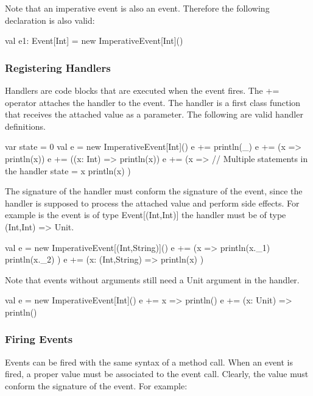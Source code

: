 \documentclass[10pt,a4paper]{article}
\newcommand{\code}[1]{{\fontfamily{cmtt}\small\selectfont#1}}
\begin{document}
Note that an imperative event is also an event. Therefore the
following declaration is also valid:

\begin{codenv}
val e1: Event[Int] = new ImperativeEvent[Int]()
\end{codenv}



\subsubsection{Registering Handlers}

Handlers are code blocks that are executed when the event fires. The
\code{+=} operator attaches the handler to the event. The handler is a
first class function that receives the attached value as a parameter.
The following are valid handler definitions.

\begin{codenv}
var state = 0
val e = new ImperativeEvent[Int]()
e += { println(_) }
e += (x => println(x))
e += ((x: Int) => println(x))
e += (x => {  // Multiple statements in the handler
  state = x 
  println(x)
})
\end{codenv}

The signature of the handler must conform the signature of the event,
since the handler is supposed to process the attached value and
perform side effects. For example is the event is of type
\code{Event[(Int,Int)]} the handler must be of type \code{(Int,Int) =>
  Unit}.

\begin{codenv}
val e = new ImperativeEvent[(Int,String)]()
e += (x => {
  println(x._1)
  println(x._2)
})
e += (x: (Int,String) => {
  println(x)
})
\end{codenv}

Note that events without arguments still need a \code{Unit} argument
in the handler.

\begin{codenv}
val e = new ImperativeEvent[Int]()
e += { x => println() }
e += { (x: Unit) => println() }
\end{codenv}






\subsubsection{Firing Events}

Events can be fired with the same syntax of a method call. When an
event is fired, a proper value must be associated to the event
call. Clearly, the value must conform the signature of the event. For
example:
\end{document}
